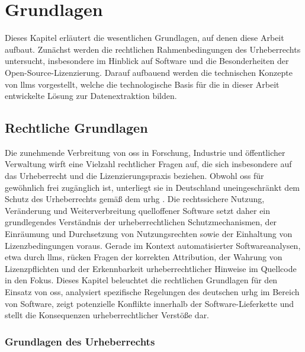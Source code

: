 \chapter{Grundlagen}\label{ch:grundlagen}

Dieses Kapitel erläutert die wesentlichen Grundlagen, auf denen diese Arbeit aufbaut.
Zunächst werden die rechtlichen Rahmenbedingungen des Urheberrechts untersucht, insbesondere im Hinblick auf Software und die Besonderheiten der Open-Source-Lizenzierung.
Darauf aufbauend werden die technischen Konzepte von \glspl{llm} vorgestellt, welche die technologische Basis für die in dieser Arbeit entwickelte Lösung zur Datenextraktion bilden.


\section{Rechtliche Grundlagen}\label{sec:rechtliches}

Die zunehmende Verbreitung von \gls{oss} in Forschung, Industrie und öffentlicher Verwaltung wirft eine Vielzahl rechtlicher Fragen auf, die sich insbesondere auf das Urheberrecht und die Lizenzierungspraxis beziehen.
Obwohl \gls{oss} für gewöhnlich frei zugänglich ist, unterliegt sie in Deutschland uneingeschränkt dem Schutz des Urheberrechts gemäß dem \gls{urhg} \autocite{noauthor_urhg_nodate}.
Die rechtssichere Nutzung, Veränderung und Weiterverbreitung quelloffener Software setzt daher ein grundlegendes Verständnis der urheberrechtlichen Schutzmechanismen, der Einräumung und Durchsetzung von Nutzungsrechten sowie der Einhaltung von Lizenzbedingungen voraus.
Gerade im Kontext automatisierter Softwareanalysen, etwa durch \glspl{llm}, rücken Fragen der korrekten Attribution, der Wahrung von Lizenzpflichten und der Erkennbarkeit urheberrechtlicher Hinweise im Quellcode in den Fokus.
Dieses Kapitel beleuchtet die rechtlichen Grundlagen für den Einsatz von \gls{oss}, analysiert spezifische Regelungen des deutschen \gls{urhg} im Bereich von Software, zeigt potenzielle Konflikte innerhalb der Software-Lieferkette und stellt die Konsequenzen urheberrechtlicher Verstöße dar.


\subsection{Grundlagen des Urheberrechts}\label{subsec:grundlagen-des-urheberrechts}

